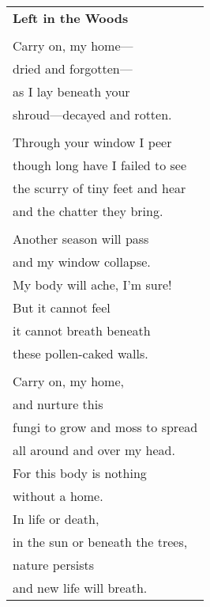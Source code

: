 \documentclass{article}
\begin{document}
\begin{center}
\begin{tabular}{l}
\textbf{Left in the Woods} \\
\\
Carry on, my home--- \\
dried and forgotten--- \\
as I lay beneath your \\
shroud---decayed and rotten. \\
\\
Through your window I peer \\
though long have I failed to see \\
the scurry of tiny feet and hear \\
and the chatter they bring. \\
\\
Another season will pass \\
and my window collapse. \\
My body will ache, I'm sure! \\
But it cannot feel \\
it cannot breath beneath\\
these pollen-caked walls. \\
\\
Carry on, my home, \\
and nurture this \\
fungi to grow and moss to spread \\
all around and over my head. \\
For this body is nothing \\
without a home. \\
In life or death, \\
in the sun or beneath the trees, \\
nature persists \\
and new life will breath. \\ %
\end{tabular}
\end{center}
\end{document}
